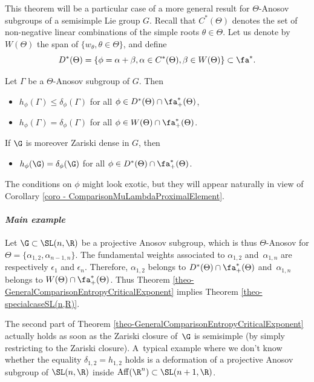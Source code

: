This theorem will be a particular case of a more general result for $\Theta$-Anosov subgroups of a semisimple Lie group $G$. Recall that $C^*(\Theta)$ denotes the set of non-negative linear combinations of the simple roots $\theta \in \Theta$. Let us denote by $W(\Theta)$ the span of $\{w_\theta, \theta \in \Theta\}$, and define
\[D^*(\Theta) = \{\phi = \alpha + \beta, \alpha \in C^*(\Theta), \beta \in W(\Theta)\} \subset \fa^*.\]

\begin{theo} \label{theo-GeneralComparisonEntropyCriticalExponent}
Let $\Gamma$ be a $\Theta$-Anosov subgroup of $G$. Then
\begin{itemize}
\item $h_\phi(\Gamma) \leq \delta_\phi(\Gamma)$ for all $\phi\in D^*(\Theta)\cap \fa_+^*(\Theta)$,
\item $h_\phi(\Gamma) = \delta_\phi(\Gamma)$ for all $\phi \in W(\Theta)\cap \fa_+^*(\Theta)$.
\end{itemize}

If $\G$ is moreover Zariski dense in $G$, then
\begin{itemize}
\item $h_\phi(\G) =\delta_\phi(\G)$ for all $\phi \in D^*(\Theta)\cap \fa_+^*(\Theta)$.
\end{itemize}
\end{theo}

The conditions on $\phi$ might look exotic, but they will appear naturally in view of Corollary \ref{coro - ComparisonMuLambdaProximalElement}.

\paragraph{{\it Main example}} Let $\G \subset \SL(n,\R)$ be a projective Anosov subgroup, which is thus $\Theta$\nobreakdash-Anosov for $\Theta=\{\alpha_{1,2}, \alpha_{n-1,n}\}$. The fundamental weights associated to $\alpha_{1,2}$ and~$\alpha_{1,n}$ are respectively $\epsilon_1$ and $\epsilon_n$. Therefore, $\alpha_{1,2}$ belongs to
$D^*(\Theta)\cap \fa_+^*(\Theta)$ and~$\alpha_{1,n}$ belongs to $W(\Theta)\cap \fa_+^*(\Theta)$. Thus Theorem \ref{theo-GeneralComparisonEntropyCriticalExponent} implies Theorem \ref{theo-specialcaseSL(n,R)}.

\begin{rmk}
The second part of Theorem \ref{theo-GeneralComparisonEntropyCriticalExponent} actually holds as soon as the Zariski closure of\, $\G$ is semisimple (by simply restricting to the Zariski closure). A~typical example where we don't know whether the equality $\delta_{1,2} = h_{1,2}$ holds is a defor\-mation of a projective Anosov subgroup of $\SL(n,\R)$ inside $\mathrm{Aff}(\R^n) \subset \SL(n+\nobreak1,\R)$.
\end{rmk}


